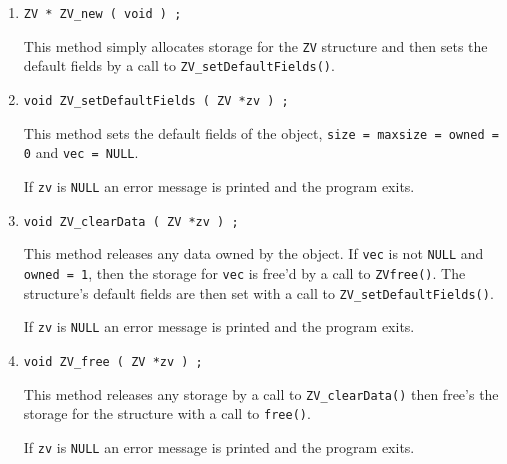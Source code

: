 \begin{enumerate}
\item
\begin{verbatim}
ZV * ZV_new ( void ) ;
\end{verbatim}
This method simply allocates storage for the {\tt ZV} structure 
and then sets the default fields by a call to 
{\tt ZV\_setDefaultFields()}.
\item
\begin{verbatim}
void ZV_setDefaultFields ( ZV *zv ) ;
\end{verbatim}
This method sets the default fields of the object,
{\tt size = maxsize = owned = 0} and {\tt vec = NULL}.
\par {}
If {\tt zv} is {\tt NULL}
an error message is printed and the program exits.
\item
\begin{verbatim}
void ZV_clearData ( ZV *zv ) ;
\end{verbatim}
This method releases any data owned by the object. 
If {\tt vec} is not {\tt NULL} and {\tt owned = 1},
then the storage for {\tt vec} is free'd by a call to
{\tt ZVfree()}.
The structure's default fields are then set 
with a call to {\tt ZV\_setDefaultFields()}.
\par {}
If {\tt zv} is {\tt NULL}
an error message is printed and the program exits.
\item
\begin{verbatim}
void ZV_free ( ZV *zv ) ;
\end{verbatim}
This method releases any storage by a call to 
{\tt ZV\_clearData()} then free's the storage for the 
structure with a call to {\tt free()}.
\par {}
If {\tt zv} is {\tt NULL}
an error message is printed and the program exits.
\end{enumerate}
\par

